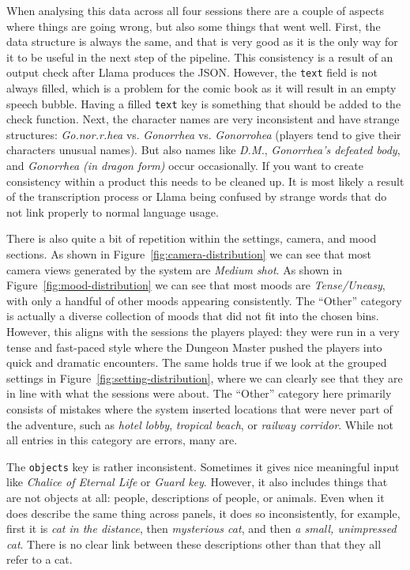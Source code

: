 When analysing this data across all four sessions there are a couple of aspects where things are going wrong, but also some things that went well. First, the data structure is always the same, and that is very good as it is the only way for it to be useful in the next step of the pipeline. This consistency is a result of an output check after Llama produces the JSON. However, the \texttt{text} field is not always filled, which is a problem for the comic book as it will result in an empty speech bubble. Having a filled \texttt{text} key is something that should be added to the check function. Next, the character names are very inconsistent and have strange structures: \textit{Go.nor.r.hea} vs. \textit{Gonorrhea} vs. \textit{Gonorrohea} (players tend to give their characters unusual names). But also names like \textit{D.M.}, \textit{Gonorrhea's defeated body}, and \textit{Gonorrhea (in dragon form)} occur occasionally. If you want to create consistency within a product this needs to be cleaned up. It is most likely a result of the transcription process or Llama being confused by strange words that do not link properly to normal language usage.  

There is also quite a bit of repetition within the settings, camera, and mood sections. As shown in Figure~\ref{fig:camera-distribution} we can see that most camera views generated by the system are \textit{Medium shot}. As shown in Figure~\ref{fig:mood-distribution} we can see that most moods are \textit{Tense/Uneasy}, with only a handful of other moods appearing consistently. The ``Other'' category is actually a diverse collection of moods that did not fit into the chosen bins. However, this aligns with the sessions the players played: they were run in a very tense and fast-paced style where the Dungeon Master pushed the players into quick and dramatic encounters. The same holds true if we look at the grouped settings in Figure~\ref{fig:setting-distribution}, where we can clearly see that they are in line with what the sessions were about. The ``Other'' category here primarily consists of mistakes where the system inserted locations that were never part of the adventure, such as \textit{hotel lobby}, \textit{tropical beach}, or \textit{railway corridor}. While not all entries in this category are errors, many are.  

The \texttt{objects} key is rather inconsistent. Sometimes it gives nice meaningful input like \textit{Chalice of Eternal Life} or \textit{Guard key}. However, it also includes things that are not objects at all: people, descriptions of people, or animals. Even when it does describe the same thing across panels, it does so inconsistently, for example, first it is \textit{cat in the distance}, then \textit{mysterious cat}, and then \textit{a small, unimpressed cat}. There is no clear link between these descriptions other than that they all refer to a cat.  

